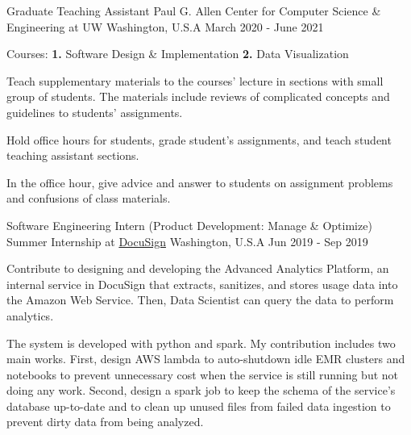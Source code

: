 \begin{cventries}
  \cventry
    {Graduate Teaching Assistant} %
    {Paul G. Allen Center for Computer Science \& Engineering at UW} %
    {Washington, U.S.A} %
    {March 2020 - June 2021} %
    {
      \begin{cvitems} %
        \item {
          Courses: \textbf{1.} Software Design \& Implementation \textbf{2.} Data Visualization
        }
        \item {
          Teach supplementary materials to the courses' lecture in sections with small group of students.
          The materials include reviews of complicated concepts and guidelines to students' assignments.
        }
        \item {
          Hold office hours for students, grade student's assignments, and teach student teaching assistant sections.
        }
        \item {
          In the office hour, give advice and answer to students on assignment problems and confusions of class materials.
        }
      \end{cvitems}
    }

  \cventry
    {Software Engineering Intern (Product Development: Manage \& Optimize)} %
    {Summer Internship at \href{https://www.docusign.com/}{DocuSign}} %
    {Washington, U.S.A} %
    {Jun 2019 - Sep 2019} %
    {
      \begin{cvitems} %
        \item {
          Contribute to designing and developing the Advanced Analytics Platform, an internal service in DocuSign that extracts, sanitizes, and stores usage data into the Amazon Web Service.
          Then, Data Scientist can query the data to perform analytics.
        }
        \item {
          The system is developed with python and spark. My contribution includes two main works.
          First, design AWS lambda to auto-shutdown idle EMR clusters and notebooks to prevent unnecessary cost when the service is still running but not doing any work.
          Second, design a spark job to keep the schema of the service's database up-to-date and to clean up unused files from failed data ingestion to prevent dirty data from being analyzed.
        }
      \end{cvitems}
    }

\end{cventries}
